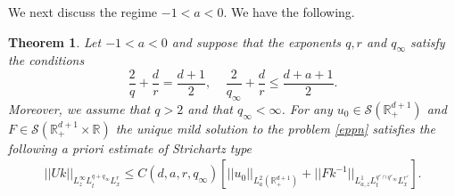\documentclass[11pt,letter]{amsart}
\def \RN {\mathbb{R}_+^{d+1}}
\def \R {\mathbb{R}}
\numberwithin{equation}{section}
\newtheorem{theorem}{Theorem}[section]
\numberwithin{equation}{section}
\begin{document}
We next discuss the regime $-1<a<0$. We have the following.

\begin{theorem}\label{T:bulknega}
Let $-1<a<0$ and suppose that the exponents $q, r$ and $q_\infty$ satisfy the conditions
\begin{equation}\label{uffa}
\frac 2{q} +\frac dr = \frac{d+1}2,\ \ \ \ \ \frac{2}{q_\infty} +\frac dr \le \frac{d+a+1}2.
\end{equation}
Moreover, we assume that $q>2$ and that $q_\infty<\infty$. For any $u_0\in \mathscr S(\RN)$ and $F\in \mathscr S(\RN\times \R)$ the unique mild solution to the problem \eqref{eppn} satisfies the following a priori estimate of Strichartz type
\begin{align}\label{bulk22}
||U k||_{L^\infty_z L^{q+q_\infty}_t L^r_x} \le C(d,a,r,q_\infty)\left[||u_0||_{L^2_a(\RN)} + ||F k^{-1}||_{L^1_{a,z} L^{q'\cap q'_\infty}_t L^{r'}_x }\right].
\end{align}
\end{theorem}
\end{document}
